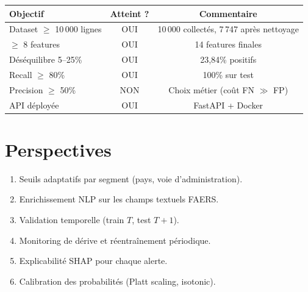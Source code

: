 \documentclass[11pt,a4paper,twoside,openright]{report}
\begin{document}
\begin{table}[H]
  \centering
  \begin{tabular}{lcc}
    \toprule
    \textbf{Objectif} & \textbf{Atteint ?} & \textbf{Commentaire} \\
    \midrule
    Dataset $\geq$ 10\,000 lignes & OUI & 10\,000 collectés, 7\,747 après nettoyage \\
    $\geq$ 8 features & OUI & 14 features finales \\
    Déséquilibre 5–25\% & OUI & 23,84\% positifs \\
    Recall $\geq$ 80\% & OUI & 100\% sur test \\
    Precision $\geq$ 50\% & NON & Choix métier (coût FN $\gg$ FP) \\
    API déployée & OUI & FastAPI + Docker \\
    \bottomrule
  \end{tabular}
\end{table}

\section*{Perspectives}

\begin{enumerate}
  \item Seuils adaptatifs par segment (pays, voie d'administration).
  \item Enrichissement NLP sur les champs textuels FAERS.
  \item Validation temporelle (train $T$, test $T+1$).
  \item Monitoring de dérive et réentraînement périodique.
  \item Explicabilité SHAP pour chaque alerte.
  \item Calibration des probabilités (Platt scaling, isotonic).
\end{enumerate}
\end{document}
